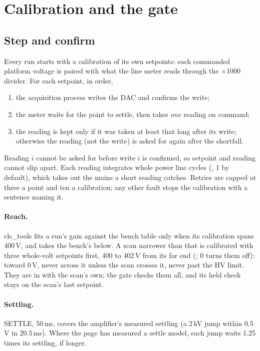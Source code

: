 \section{Calibration and the gate}
\label{sec:calibration}

\subsection{Step and confirm}

Every run starts with a calibration of its own setpoints: each commanded platform voltage is
paired with what the line meter reads through the $\times$1000 divider. For each setpoint,
in order,
\begin{enumerate}
    \item the acquisition process writes the DAC and confirms the write;
    \item the meter waits for the point to settle, then takes \emph{one} reading on command;
    \item the reading is kept only if it was taken at least that long after its write;
        otherwise the reading (not the write) is asked for again after the shortfall.
\end{enumerate}
Reading $i$ cannot be asked for before write $i$ is confirmed, so setpoint and reading
cannot slip apart. Each reading integrates whole power line cycles
(, 1 by default), which takes out the mains a short reading
catches. Retries are capped at three a point and ten a calibration; any other fault stops
the calibration with a sentence naming it.

\paragraph{Reach.} cls\_tools fits a run's gain against the bench table only when its
calibration spans 400\,V, and takes the bench's below. A scan narrower than that is
calibrated with three whole-volt setpoints first, 400 to 402\,V from its far end
(; 0 turns them off): toward 0\,V, never across it unless the
scan crosses it, never past the HV limit. They are in  with the scan's own;
the gate checks them all, and its held check stays on the scan's last setpoint.

\paragraph{Settling.}
SETTLE, 50\,ms, covers the amplifier's measured settling (a 2\,kV jump within 0.5\,V in
20.5\,ms). Where the  page has measured a settle model, each jump waits
1.25 times its settling, if longer.

